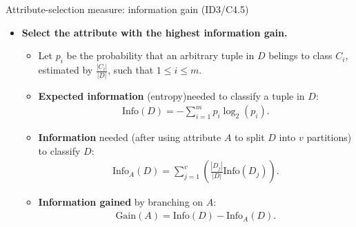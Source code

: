 \documentclass[aspectratio=169,t,table]{beamer}
\begin{document}
  {
    \begin{frame}{Attribute-selection measure: information gain (ID3/C4.5)}
      \begin{itemize}
        \item \textbf{Select the attribute with the highest information gain.}
        \begin{itemize}
          \item Let $p_i$ be the probability that an arbitrary tuple in $D$ belings to class $C_i$,\\ estimated by $\frac{|C_i|}{|D|}$, such that $1 \leq i \leq m$.
          \item \textbf{Expected information} (entropy)needed to classify a tuple in $D$:
          \begin{align}
            \text{Info}(D) = -\sum_{i=1}^{m}p_i \log_2(p_i).
          \end{align}
          \item \textbf{Information} needed (after using attribute $A$ to split $D$ into $v$ partitions) to classify $D$:
          \begin{align}
            \text{Info}_A(D) = \sum_{j=1}^v \left( \frac{|D_j|}{|D|} \text{Info}(D_j) \right).
          \end{align}
          \item \textbf{Information gained} by branching on $A$:
          \begin{align}
            \text{Gain}(A)=\text{Info}(D)-\text{Info}_A(D).
          \end{align}
        \end{itemize}
      \end{itemize}
    \end{frame}
  }
\end{document}
